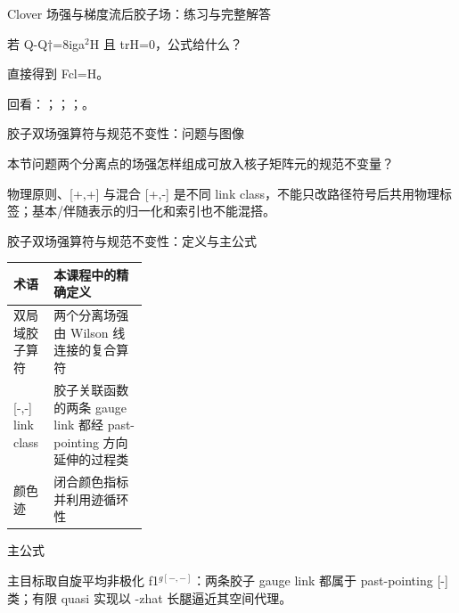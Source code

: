 \begin{frame}[t]{Clover 场强与梯度流后胶子场：练习与完整解答}
\footnotesize
\begin{block}{}若 Q-Q†=8iga\ensuremath{^{2}}H 且 trH=0，公式给什么？\end{block}
\begin{exampleblock}{}直接得到 Fcl=H。\end{exampleblock}
\vfill
\scriptsize 回看：；；；。
\end{frame}

\begin{frame}[t]{胶子双场强算符与规范不变性：问题与图像}
\footnotesize
\begin{block}{本节问题}两个分离点的场强怎样组成可放入核子矩阵元的规范不变量？\end{block}
\begin{block}{物理原则}\quad [-,-]、[+,+] 与混合 [+,-] 是不同 link class，不能只改路径符号后共用物理标签；基本/\allowbreak{}伴随表示的归一化和索引也不能混搭。\end{block}
\end{frame}

\begin{frame}[t]{胶子双场强算符与规范不变性：定义与主公式}
\footnotesize\begin{tabularx}{\linewidth}{p{0.30\linewidth}Y}
\toprule 术语 & 本课程中的精确定义\\\midrule
{} 双局域胶子算符 & 两个分离场强由 Wilson 线连接的复合算符\\
 [-,-] link class & 胶子关联函数的两条 gauge link 都经 past-pointing 方向延伸的过程类\\
 颜色迹 & 闭合颜色指标并利用迹循环性\\
\bottomrule\end{tabularx}\vspace{0.15cm}
\begin{block}{ 主公式}\centering{}\end{block}
主目标取自旋平均非极化 f1\ensuremath{^{g[-,-]}}：两条胶子 gauge link 都属于 past-pointing [-] 类；有限 quasi 实现以 -zhat 长腿逼近其空间代理。
\end{frame}


